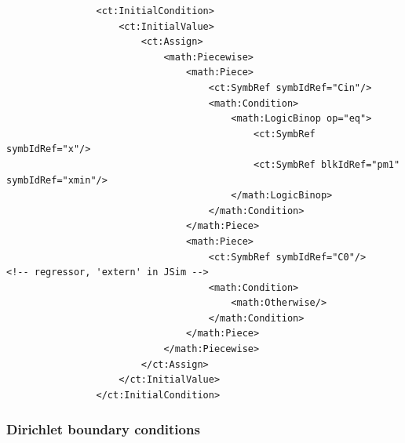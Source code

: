 \lstset{language=XML}
\begin{lstlisting}
                <ct:InitialCondition>
                    <ct:InitialValue>
                        <ct:Assign>
                            <math:Piecewise>
                                <math:Piece>
                                    <ct:SymbRef symbIdRef="Cin"/>
                                    <math:Condition>
                                        <math:LogicBinop op="eq">
                                            <ct:SymbRef symbIdRef="x"/>
                                            <ct:SymbRef blkIdRef="pm1" symbIdRef="xmin"/>
                                        </math:LogicBinop>
                                    </math:Condition>
                                </math:Piece>
                                <math:Piece>
                                    <ct:SymbRef symbIdRef="C0"/>       <!-- regressor, 'extern' in JSim -->
                                    <math:Condition>
                                        <math:Otherwise/>
                                    </math:Condition>
                                </math:Piece>
                            </math:Piecewise>
                        </ct:Assign>
                    </ct:InitialValue>
                </ct:InitialCondition>
\end{lstlisting}

\subsubsection*{Dirichlet boundary conditions}

